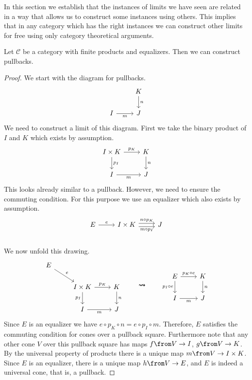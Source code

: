 In this section we establish that the instances of limits we have seen are related
in a way that allows us to construct some instances using others.
This implies that in any category which has the right instances
we can construct other limits for free using only category theoretical arguments.

\begin{theorem}
  \label{pullbackconstruction}
  Let $\mathscr C$ be a category with finite products and equalizers.
  Then we can construct pullbacks.
\end{theorem}
\begin{proof}
We start with the diagram for pullbacks.
\[
  \begin{tikzcd}
    & K \arrow{d}{n} \\
    I \arrow[swap]{r}{m} & J
  \end{tikzcd}
\]
We need to construct a limit of this diagram.
First we take the binary product of $I$ and $K$ which exists by assumption.
\[
  \begin{tikzcd}
    I \times K \arrow{r}{p_K} \arrow{d}{p_I} & K \arrow{d}{n} \\
    I \arrow[swap]{r}{m} & J
  \end{tikzcd}
\]
This looks already similar to a pullback.
However, we need to ensure the commuting condition.
For this purpose we use an equalizer which also exists by assumption.
\[
  \begin{tikzcd}
    E \arrow{r}{e} &
    I \times K
    \arrow[r,shift right,swap, "m \circ p_I"] \arrow[r,shift left, "n \circ p_K"]
    & J \\
  \end{tikzcd}
\]
We now unfold this drawing.
\[
  \begin{tikzcd}
    E \arrow{dr}{e}& &\\
    & I \times K \arrow[swap]{d}{p_I} \arrow{r}{p_K}& K \arrow{d}{n}\\
    & I \arrow[swap]{r}{m} & J
  \end{tikzcd}
  \qquad \bm{\rightsquigarrow} \qquad 
  \begin{tikzcd}
    E \arrow[swap]{d}{p_I \circ e} \arrow{r}{p_K \circ e} & K \arrow{d}{n} \\
    I \arrow[swap]{r}{m} & J
  \end{tikzcd}
\]
Since $E$ is an equalizer we have $e \circ p_K \circ n = e \circ p_I \circ m$.
Therefore, $E$ satisfies the commuting condition for cones over a pullback square.
Furthermore note that any other cone $V$ over this pullback square has maps $f \from V \to I$,
$g \from V \to K$.
By the universal property of products there is a unique map $m \from V \to I \times K$.
Since $E$ is an equalizer, there is a unique map $h \from V \to E$,
and $E$ is indeed a universal cone, that is, a pullback.
\end{proof}

